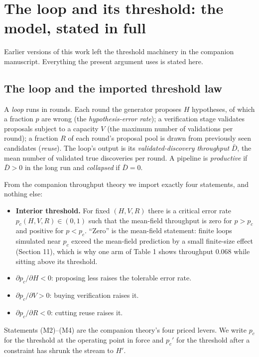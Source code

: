 \documentclass[11pt]{article}
\begin{document}
\section{The loop and its threshold: the model, stated in full}

Earlier versions of this work left the threshold machinery in the companion
manuscript. Everything the present argument uses is stated here.

\subsection{The loop and the imported threshold law}

A \emph{loop} runs in rounds. Each round the generator proposes $H$
hypotheses, of which a fraction $p$ are wrong (the \emph{hypothesis-error
rate}); a verification stage validates proposals subject to a capacity $V$
(the maximum number of validations per round); a fraction $R$ of each
round's proposal pool is drawn from previously seen candidates (\emph{reuse}).
The loop's output is its \emph{validated-discovery throughput} $\bar D$,
the mean number of validated true discoveries per round. A pipeline is
\emph{productive} if $\bar D > 0$ in the long run and \emph{collapsed} if
$\bar D = 0$.

From the companion throughput theory \cite{ghosh-throughput} we import
exactly four statements, and nothing else:

\begin{itemize}
\item[(M1)] \textbf{Interior threshold.} For fixed $(H, V, R)$ there is a
critical error rate $p_c(H, V, R) \in (0, 1)$ such that the mean-field
throughput is zero for $p > p_c$ and positive for $p < p_c$. ``Zero'' is the
mean-field statement: finite loops simulated near $p_c$ exceed the
mean-field prediction by a small finite-size effect (Section 11), which is
why one arm of Table 1 shows throughput $0.068$ while sitting above its
threshold.
\item[(M2)] $\partial p_c / \partial H < 0$: proposing less raises the
tolerable error rate.
\item[(M3)] $\partial p_c / \partial V > 0$: buying verification raises it.
\item[(M4)] $\partial p_c / \partial R < 0$: cutting reuse raises it.
\end{itemize}

Statements (M2)--(M4) are the companion theory's four priced levers. We write
$p_c$ for the threshold at the operating point in force and $p_c'$ for the
threshold after a constraint has shrunk the stream to $H'$.
\end{document}
